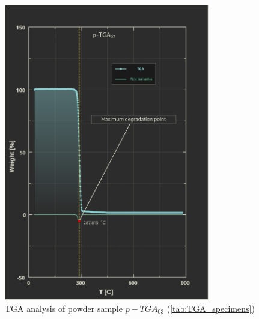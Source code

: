 \documentclass{article}
\begin{document}
        \begin{figure}[h!]
            \centering
            \includegraphics[width=0.8\textwidth]{Pictures/Thermal_analysis_plots/TGA_catalogued/p-TGA03.eps}
            \caption{TGA analysis of powder sample $p-TGA_{03}$ (\ref{tab:TGA_specimens})}
            \label{fig:TGA_03}
        \end{figure}
\end{document}
